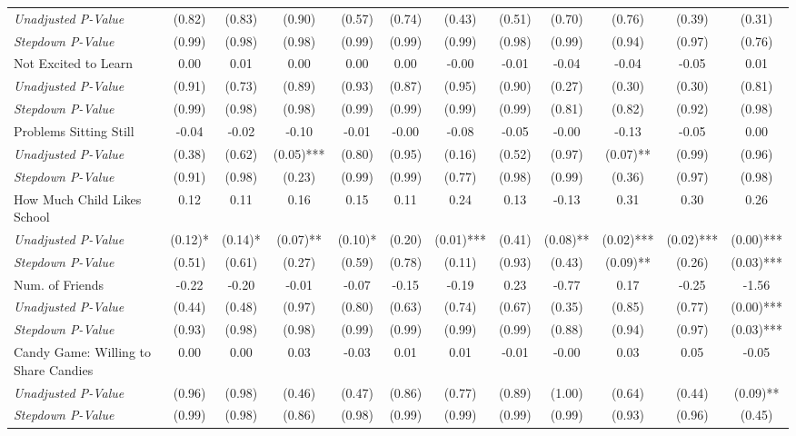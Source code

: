 \begin{tabular}{l c c c c c c c c c c c}
\quad \textit{Unadjusted P-Value} & (0.82) & (0.83) & (0.90) & (0.57) & (0.74) & (0.43) & (0.51) & (0.70) & (0.76) & (0.39) & (0.31) \\
\quad \textit{Stepdown P-Value} & (0.99) & (0.98) & (0.98) & (0.99) & (0.99) & (0.99) & (0.98) & (0.99) & (0.94) & (0.97) & (0.76) \\
Not Excited to Learn & 0.00 & 0.01 & 0.00 & 0.00 & 0.00 & -0.00 & -0.01 & -0.04 & -0.04 & -0.05 & 0.01 \\
\quad \textit{Unadjusted P-Value} & (0.91) & (0.73) & (0.89) & (0.93) & (0.87) & (0.95) & (0.90) & (0.27) & (0.30) & (0.30) & (0.81) \\
\quad \textit{Stepdown P-Value} & (0.99) & (0.98) & (0.98) & (0.99) & (0.99) & (0.99) & (0.99) & (0.81) & (0.82) & (0.92) & (0.98) \\
Problems Sitting Still & -0.04 & -0.02 & -0.10 & -0.01 & -0.00 & -0.08 & -0.05 & -0.00 & -0.13 & -0.05 & 0.00 \\
\quad \textit{Unadjusted P-Value} & (0.38) & (0.62) & (0.05)*** & (0.80) & (0.95) & (0.16) & (0.52) & (0.97) & (0.07)** & (0.99) & (0.96) \\
\quad \textit{Stepdown P-Value} & (0.91) & (0.98) & (0.23) & (0.99) & (0.99) & (0.77) & (0.98) & (0.99) & (0.36) & (0.97) & (0.98) \\
How Much Child Likes School & 0.12 & 0.11 & 0.16 & 0.15 & 0.11 & 0.24 & 0.13 & -0.13 & 0.31 & 0.30 & 0.26 \\
\quad \textit{Unadjusted P-Value} & (0.12)* & (0.14)* & (0.07)** & (0.10)* & (0.20) & (0.01)*** & (0.41) & (0.08)** & (0.02)*** & (0.02)*** & (0.00)*** \\
\quad \textit{Stepdown P-Value} & (0.51) & (0.61) & (0.27) & (0.59) & (0.78) & (0.11) & (0.93) & (0.43) & (0.09)** & (0.26) & (0.03)*** \\
Num. of Friends & -0.22 & -0.20 & -0.01 & -0.07 & -0.15 & -0.19 & 0.23 & -0.77 & 0.17 & -0.25 & -1.56 \\
\quad \textit{Unadjusted P-Value} & (0.44) & (0.48) & (0.97) & (0.80) & (0.63) & (0.74) & (0.67) & (0.35) & (0.85) & (0.77) & (0.00)*** \\
\quad \textit{Stepdown P-Value} & (0.93) & (0.98) & (0.98) & (0.99) & (0.99) & (0.99) & (0.99) & (0.88) & (0.94) & (0.97) & (0.03)*** \\
Candy Game: Willing to Share Candies & 0.00 & 0.00 & 0.03 & -0.03 & 0.01 & 0.01 & -0.01 & -0.00 & 0.03 & 0.05 & -0.05 \\
\quad \textit{Unadjusted P-Value} & (0.96) & (0.98) & (0.46) & (0.47) & (0.86) & (0.77) & (0.89) & (1.00) & (0.64) & (0.44) & (0.09)** \\
\quad \textit{Stepdown P-Value} & (0.99) & (0.98) & (0.86) & (0.98) & (0.99) & (0.99) & (0.99) & (0.99) & (0.93) & (0.96) & (0.45) \\
\bottomrule
\end{tabular}
